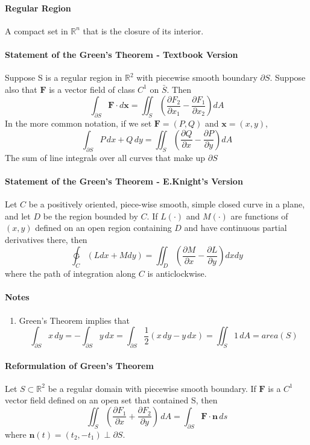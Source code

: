 \documentclass[11pt]{article}
\newcommand{\tb}[1]{\textbf{#1}}
\newcommand{\real}[0]{\mathbb{R}}
\newcommand{\vx}[0]{\tb{x}}
\newcommand{\vf}[0]{\tb{F}}
\begin{document}
\paragraph{Regular Region}
A compact set in $\real^n$ that is the closure of its interior.

\paragraph{Statement of the Green's Theorem - Textbook Version}
Suppose S is a regular region in $\real^2$ with piecewise smooth boundary $\partial S$. Suppose also that $\tb{F}$ is a vector field of class $C^1$ on $\bar{S}$. Then
$$\int_{\partial S}\tb{F}\cdot d\vx = \iint_S(\frac{\partial F_2}{\partial x_1} - \frac{\partial F_1}{\partial x_2})dA$$
In the more common notation, if we set $\tb{F} = (P,Q)$ and $\vx = (x,y)$,
$$\int_{\partial S}P \, dx + Q \, dy = \iint_S(\frac{\partial Q}{\partial x} - \frac{\partial P}{\partial y})dA$$
The sum of line integrals over all curves that make up $\partial S$

\paragraph{Statement of the Green's Theorem - E.Knight's Version} Let $C$ be a positively oriented, piece-wise smooth, simple closed curve in a plane, and let $D$ be the region bounded by $C$. If $L(\cdot)$ and $M(\cdot)$ are functions of $(x, y)$ defined on an open region containing $D$ and have continuous partial derivatives there, then
\begin{equation*}
    \ointctrclockwise_C \left(Ldx + Mdy\right) = \iint_D \left(\frac{\partial M}{\partial x} - \frac{\partial L}{\partial y}\right) dxdy
\end{equation*}
where the path of integration along $C$ is anticlockwise.

\paragraph{Notes}
\begin{enumerate}
	\item Green's Theorem implies that $$\int_{\partial S} x \, dy = -\int_{\partial S} y \, dx = \int_{\partial S} \frac{1}{2}(x\,dy - y\,dx) = \iint_S 1 \, dA = area(S)$$
\end{enumerate}
\paragraph{Reformulation of Green's Theorem}
Let $S \subset \real^2$ be a regular domain with piecewise smooth boundary. If $\vf$ is a $C^1$ vector field defined on an open set that contained S, then
$$\iint_S (\frac{\partial F_1}{\partial x} + \frac{\partial F_2}{\partial y})\, dA = \int_{\partial S}\vf \cdot \tb{n} \, ds$$
where $\tb{n}(t) = (t_2, -t_1) \perp \partial S$.
\end{document}
